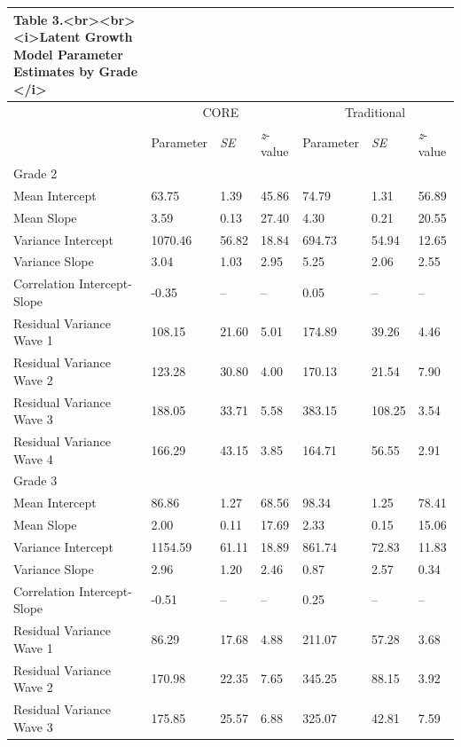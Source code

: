 \documentclass[
  english,
  man, fleqn, noextraspace]{apa6}
\begin{document}
\captionsetup[table]{labelformat=empty,skip=1pt}
\begin{longtable}{lllllll}
\caption*{
\large Table 3.<br><br><i>Latent Growth Model Parameter Estimates by Grade </i>\\ 
} \\ 
\toprule
& \multicolumn{3}{c}{CORE} & \multicolumn{3}{c}{Traditional} \\ 
 \cmidrule(lr){2-4}\cmidrule(lr){5-7}
 & Parameter & \emph{SE} & \emph{z}-value & Parameter & \emph{SE} & \emph{z}-value \\ 
\midrule
\multicolumn{1}{l}{Grade 2} \\ 
\midrule
Mean Intercept & 63.75 & 1.39 & 45.86 & 74.79 & 1.31 & 56.89 \\ 
Mean Slope & 3.59 & 0.13 & 27.40 & 4.30 & 0.21 & 20.55 \\ 
Variance Intercept & 1070.46 & 56.82 & 18.84 & 694.73 & 54.94 & 12.65 \\ 
Variance Slope & 3.04 & 1.03 & 2.95 & 5.25 & 2.06 & 2.55 \\ 
Correlation Intercept-Slope & -0.35 & -- & -- & 0.05 & -- & -- \\ 
Residual Variance Wave 1 & 108.15 & 21.60 & 5.01 & 174.89 & 39.26 & 4.46 \\ 
Residual Variance Wave 2 & 123.28 & 30.80 & 4.00 & 170.13 & 21.54 & 7.90 \\ 
Residual Variance Wave 3 & 188.05 & 33.71 & 5.58 & 383.15 & 108.25 & 3.54 \\ 
Residual Variance Wave 4 & 166.29 & 43.15 & 3.85 & 164.71 & 56.55 & 2.91 \\ 
\midrule
\multicolumn{1}{l}{Grade 3} \\ 
\midrule
Mean Intercept & 86.86 & 1.27 & 68.56 & 98.34 & 1.25 & 78.41 \\ 
Mean Slope & 2.00 & 0.11 & 17.69 & 2.33 & 0.15 & 15.06 \\ 
Variance Intercept & 1154.59 & 61.11 & 18.89 & 861.74 & 72.83 & 11.83 \\ 
Variance Slope & 2.96 & 1.20 & 2.46 & 0.87 & 2.57 & 0.34 \\ 
Correlation Intercept-Slope & -0.51 & -- & -- & 0.25 & -- & -- \\ 
Residual Variance Wave 1 & 86.29 & 17.68 & 4.88 & 211.07 & 57.28 & 3.68 \\ 
Residual Variance Wave 2 & 170.98 & 22.35 & 7.65 & 345.25 & 88.15 & 3.92 \\ 
Residual Variance Wave 3 & 175.85 & 25.57 & 6.88 & 325.07 & 42.81 & 7.59 \\ 

\end{longtable}
\end{document}
